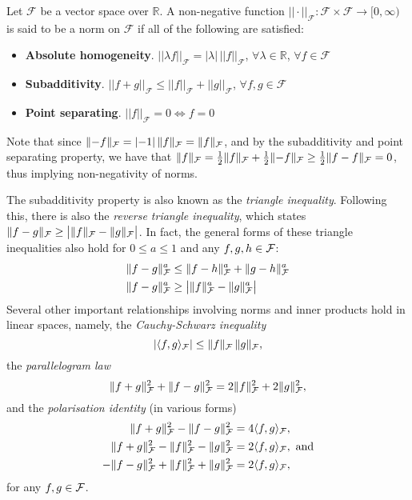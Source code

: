 \begin{definition}[Norms]
	Let $\mathcal F$ be a vector space over $\mathbb R$. A non-negative function $||\cdot||_{\mathcal F}:\mathcal F \times \mathcal F \rightarrow \mathbb [0,\infty)$ is said to be a norm  on $\mathcal F$ if all of the following are satisfied:
	\begin{itemize}
	\item \textbf{Absolute homogeneity}. $||\lambda f||_{\mathcal F} = |\lambda| \, ||f||_{\mathcal F}$, $\forall \lambda \in \mathbb R$, $\forall f \in \mathcal F$
	\item \textbf{Subadditivity}. $||f+g||_{\mathcal F} \leq ||f||_{\mathcal F} + ||g||_{\mathcal F}$, $\forall f,g \in \mathcal F$
	\item \textbf{Point separating}. $||f||_{\mathcal F} = 0 \Leftrightarrow f=0$
	\end{itemize}
	Note that since $\lVert-f\rVert_{\mathcal F} = \lvert-1\rvert \, \lVert f\rVert_{\mathcal F} = \lVert f\rVert_{\mathcal F}$, and by the subadditivity and point separating property, we have that $\lVert f\rVert_{\mathcal F} = \frac{1}{2}\lVert f\rVert_{\mathcal F} + \frac{1}{2}\lVert-f\rVert_{\mathcal F} \geq \frac{1}{2}\lVert f - f\rVert_{\mathcal F} = 0$, thus implying non-negativity of norms.
\end{definition}


The subadditivity property is also known as the \emph{triangle inequality}.
Following this, there is also the \emph{reverse triangle inequality}, which states $\lVert f-g\rVert_{\mathcal F} \geq \big\vert \lVert f\rVert_{\mathcal F} - \lVert g\rVert_{\mathcal F} \big\vert$.
In fact, the general forms of these triangle inequalities \citep[Lemma 10]{bergsma2017} also hold for $0\leq a\leq 1$ and any $f,g,h\in{\mathcal F}$:
\newcommand{\normF}[1]{\norm{#1}_\cF}
\begingroup
\setlength{\abovedisplayskip}{9pt}
\setlength{\belowdisplayskip}{7pt}
\begin{align}
  \normF{f-g}^a &\leq \normF{f-h}^a + \normF{g-h}^a \label{eq:trieq1} \\ 
  \normF{f-g}^a &\geq \big\vert \normF{f}^a - \normF{g}^a \big\vert \label{eq:trieq2}
\end{align}
\endgroup
Several other important relationships involving norms and inner products hold in linear spaces, namely, the \emph{Cauchy-Schwarz inequality}
\begingroup
\setlength{\abovedisplayskip}{9pt}
\setlength{\belowdisplayskip}{7pt}
\[
  |\langle f,g\rangle_{\mathcal F}| \leq \lVert f\rVert_{\mathcal F} \, \lVert g\rVert_{\mathcal F},
\]
\endgroup
the \emph{parallelogram law}
\begingroup
\setlength{\abovedisplayskip}{7pt}
\setlength{\belowdisplayskip}{7pt}
\[
  \lVert f+g\rVert_{\mathcal F}^2 + \lVert f-g\rVert_{\mathcal F}^2 = 2\lVert f\rVert_{\mathcal F}^2 + 2\lVert g\rVert_{\mathcal F}^2,
\]
\endgroup
and the \emph{polarisation identity} (in various forms)
\begingroup
\setlength{\abovedisplayskip}{9pt}
\setlength{\belowdisplayskip}{7pt}
\begin{align*}
  \lVert f+g\rVert_{\mathcal F}^2 - \lVert f-g\rVert_{\mathcal F}^2 &= 4\langle f,g\rangle_{\mathcal F},  \\
  \lVert f+g\rVert_{\mathcal F}^2 - \lVert f\rVert_{\mathcal F}^2 - \lVert g\rVert_{\mathcal F}^2 &= 2\langle f,g\rangle_{\mathcal F}, \text{ and}\\
  - \lVert f-g\rVert_{\mathcal F}^2 + \lVert f\rVert_{\mathcal F}^2 + \lVert g\rVert_{\mathcal F}^2  &= 2\langle f,g\rangle_{\mathcal F},
\end{align*}
\endgroup
for any $f,g\in{\mathcal F}$.


